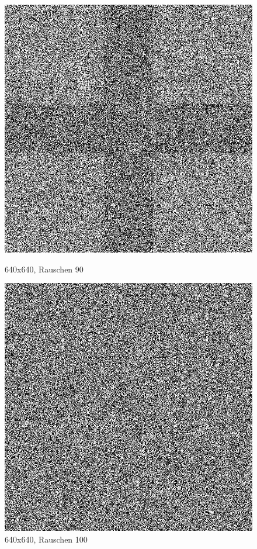 \begin{figure}[hbt]
	\begin{minipage}{0.5 \textwidth}
		\includegraphics[width=\textwidth]{./Bilder/Auswertung/BeispielBilder/Picture_Crossing_noise_90_pixelCnt_128_featureCnt_5}
		\caption{640x640, Rauschen 90}
	\end{minipage}
	\hfill
	\begin{minipage}{0.5 \textwidth}
		\includegraphics[width=\textwidth]{./Bilder/Auswertung/BeispielBilder/Picture_Crossing_noise_100_pixelCnt_128_featureCnt_5}
		\caption{640x640, Rauschen 100}
	\end{minipage}
\end{figure}

